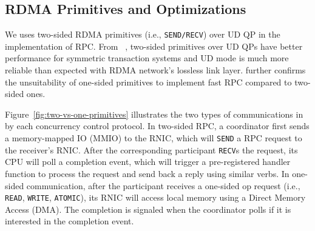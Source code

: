 \begin{comment}
In our \projectname, 
we assume that there is just one data fetching and execution stage. However the implementation
can be applied to transactions with multiple date fetching and execution stages.
The execution of each read and write is
composed of three stages:
1) {\em access} the data and add the operation into {\em read or write set};
2) {\em validate} the operation; and 
3) {\em commit} the write set when the transaction

Generally, a transaction execution is divided into three stages, and consists of write or read operations. The first stage is \textbf{fetching}, where the write or read operation  fetches the needed record. The second stage is \textbf{execution}, where the transaction will do the actual computation locally using the record just fetched. The third stage is \textbf{commit}. In this stage, the transaction checks the metadata to find out if the execution was valid. after which it commits the updated records as well as their corresponding metadata.
\end{comment}

\subsection{RDMA Primitives and Optimizations}




We uses two-sided RDMA primitives (i.e., \texttt{SEND/RECV}) over UD QP in the
implementation of RPC. From ~\cite{kalia2016fasst},
two-sided primitives over UD QPs have better performance for symmetric transaction systems  and UD mode is much more reliable than expected with RDMA network's lossless link layer. \cite{wei2018deconstructing} further confirms the unsuitability of one-sided primitives to implement fast RPC compared to two-sided ones. 


Figure~\ref{fig:two-vs-one-primitives} illustrates the two types of communications in \projectname by each concurrency control protocol. In two-sided RPC, a coordinator first sends a memory-mapped IO (MMIO) to the RNIC, which will \texttt{SEND} a RPC request to the receiver's RNIC. After the corresponding participant \texttt{RECV}s the request, its CPU will poll a completion event, 
which will trigger a pre-registered handler function to process the request and send back a reply using similar verbs. In one-sided communication, after the participant receives a one-sided op request (i.e., \texttt{READ}, \texttt{WRITE}, \texttt{ATOMIC}), its RNIC will access local memory using a Direct Memory Access (DMA). The completion is signaled when the coordinator polls if it is interested in the completion event.


